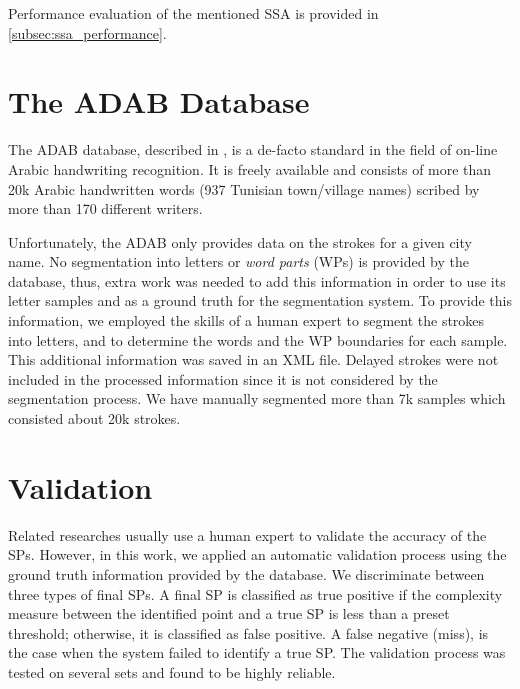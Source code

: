 \documentclass[10pt, conference, compsocconf]{IEEEtran}
\begin{document}
Performance evaluation of the mentioned SSA is provided in \ref{subsec:ssa_performance}.

\section{The ADAB Database}
\label{sec:database}
The ADAB database, described in \cite{el2009icdar}, is a de-facto standard in the field of on-line Arabic handwriting recognition. 
It is freely available and consists of more than 20k Arabic handwritten words (937 Tunisian town/village names) scribed by more than 170 different writers. 

Unfortunately, the ADAB only provides data on the strokes for a given city name. 
No segmentation into letters or \emph{word parts} (WPs) is provided by the database, thus, extra work was needed to add this information in order to use its letter samples and as a ground truth for the segmentation system.
To provide this information, we employed the skills of a human expert to segment the strokes into letters, and to determine the words and the WP boundaries for each sample. 
This additional information was saved in an XML file. 
Delayed strokes were not included in the processed information since it is not considered by the segmentation process.
We have manually segmented more than 7k samples which consisted about 20k strokes. 


\section{Validation}
\label{sec:validation}
Related researches usually use a human expert to validate the accuracy of the SPs. However, in this work, we applied an automatic validation process using the ground truth information provided by the database. We discriminate between three types of final SPs. A final SP is classified as true positive if the complexity measure between the identified point and a true SP is less than a preset threshold; otherwise, it is classified as false positive. A false negative (miss), is the case when the system failed to identify a true SP.
The validation process was tested on several sets and found to be highly reliable.
\end{document}
